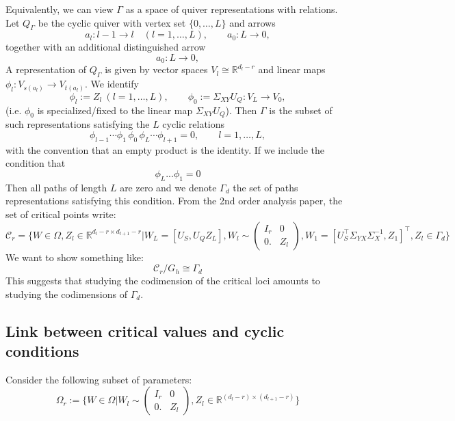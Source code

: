\documentclass{article}
\theoremstyle{definition}
\begin{document}
Equivalently, we can view $\Gamma$ as a space of quiver representations with relations.
Let $Q_\Gamma$ be the cyclic quiver with vertex set $\{0,\ldots,L\}$ and arrows
\[
    a_l: l-1 \to l \quad (l=1,\ldots,L),
    \qquad
    a_{0}: L\to 0,
\]
together with an additional distinguished arrow
\[
    a_{0}: L \to 0,
\]
A representation of $Q_\Gamma$ is given by vector spaces
$V_l\cong\mathbb{R}^{d_l-r}$ and linear maps $\phi_l:V_{s(a_l)}\to V_{t(a_l)}$.
We identify
\[
    \phi_l := Z_l \ (l=1,\ldots,L),
    \qquad
    \phi_{0} := \Sigma_{XY}U_Q : V_L \to V_0,
\]
(i.e. $\phi_{0}$ is specialized/fixed to the linear map $\Sigma_{XY}U_Q$).
Then $\Gamma$ is the subset of such representations satisfying the $L$ cyclic relations
\[
    \phi_{l-1}\cdots\phi_1\,\phi_{0}\,\phi_L\cdots\phi_{l+1}=0,
    \qquad l=1,\ldots,L,
\]
with the convention that an empty product is the identity.
If we include the condition that $$\phi_L...\phi_1=0$$ Then all paths of length $L$ are zero and we denote $\Gamma_d$ the set of paths representations satisfying this condition.
From the 2nd order analysis paper, the set of critical points write:
\begin{equation*}
    \mathcal{C}_r = \{W\in \Omega, Z_l\in\mathbb{R}^{d_l-r\times d_{l+1}-r}|W_L = [U_S, U_QZ_L],  W_l \sim \begin{pmatrix} I_r & 0 \\
                                                      0.  & Z_l      
                                        \end{pmatrix}, W_1 = [U_S^{\top}\Sigma_{YX}\Sigma_X^{-1}, Z_1 ]^{\top}, Z_l\in\Gamma_d\}
\end{equation*}
We want to show something like:
\begin{equation*}
    \mathcal{C}_r /G_h \cong \Gamma_d
\end{equation*}
This suggests that studying the codimension of the critical loci amounts to studying the codimensions of $\Gamma_d$.
\subsection{Link between critical values and cyclic conditions}
Consider the following subset of parameters:
\begin{equation*}
    \Omega_r := \{W\in \Omega| W_l \sim \begin{pmatrix} I_r & 0 \\
                                                      0.  & Z_l      
                                        \end{pmatrix}, Z_l\in\mathbb{R}^{(d_l-r)\times(d_{l+1}-r)}\}
\end{equation*}
\end{document}
